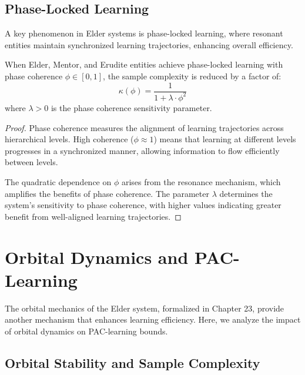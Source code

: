 \subsection{Phase-Locked Learning}

A key phenomenon in Elder systems is phase-locked learning, where resonant entities maintain synchronized learning trajectories, enhancing overall efficiency.

\begin{theorem}
When Elder, Mentor, and Erudite entities achieve phase-locked learning with phase coherence $\phi \in [0, 1]$, the sample complexity is reduced by a factor of:
\begin{equation}
\kappa(\phi) = \frac{1}{1 + \lambda \cdot \phi^2}
\end{equation}
where $\lambda > 0$ is the phase coherence sensitivity parameter.
\end{theorem}

\begin{proof}
Phase coherence measures the alignment of learning trajectories across hierarchical levels. High coherence ($\phi \approx 1$) means that learning at different levels progresses in a synchronized manner, allowing information to flow efficiently between levels.

The quadratic dependence on $\phi$ arises from the resonance mechanism, which amplifies the benefits of phase coherence. The parameter $\lambda$ determines the system's sensitivity to phase coherence, with higher values indicating greater benefit from well-aligned learning trajectories.
\end{proof}

\section{Orbital Dynamics and PAC-Learning}

The orbital mechanics of the Elder system, formalized in Chapter 23, provide another mechanism that enhances learning efficiency. Here, we analyze the impact of orbital dynamics on PAC-learning bounds.

\subsection{Orbital Stability and Sample Complexity}

